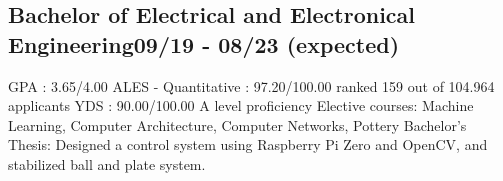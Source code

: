 \vspace*{10pt}
\subsection{{Bachelor of Electrical and Electronical Engineering}\hfill 09/19 - 08/23 (expected)}
\vspace*{5pt}
GPA : 3.65/4.00 \newline
ALES - Quantitative : 97.20/100.00 \hfill ranked 159 out of 104.964 applicants \newline
YDS : 90.00/100.00 \hfill A level proficiency \newline
Elective courses: Machine Learning, Computer Architecture, Computer Networks, Pottery \newline
Bachelor's Thesis: Designed a control system using Raspberry Pi Zero and OpenCV, and stabilized ball and plate system.
